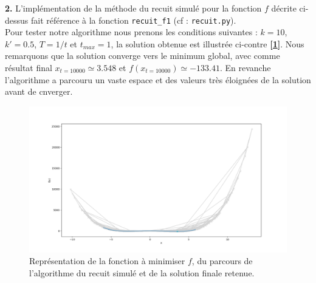 \documentclass[12pt]{article}
\begin{document}
\begin{minipage}{0.5\textwidth}
\textbf{\color{brick}2.} L'implémentation de la méthode du recuit simulé pour la fonction $f$ décrite ci-dessus fait référence à la fonction \verb|recuit_f1| (cf : \verb|recuit.py|).\\
 Pour tester notre algorithme nous prenons les conditions suivantes : $k=10$, $k'=0.5$, $T=1/t$ et $t_{max}=1$, la solution obtenue est illustrée ci-contre \textbf{[\ref{Q1_2}]}. Nous remarquons que la solution converge vers le minimum global, avec comme résultat final $x_{t=10000} \simeq 3.548  $ et $f(x_{t=10000}) \simeq -133.41$. En revanche l'algorithme a parcouru un vaste espace et des valeurs très éloignées de la solution avant de cnverger.
\end{minipage} \hfill
\begin{minipage}{0.45\textwidth}
\begin{figure}[H]
\includegraphics[width=1\textwidth]{Q1_2.png}
\caption{Représentation de la fonction à minimiser  $f$, du parcours de l'algorithme du recuit simulé et de la solution finale retenue.}
\label{Q1_2}
\end{figure}
\end{minipage}
\end{document}
